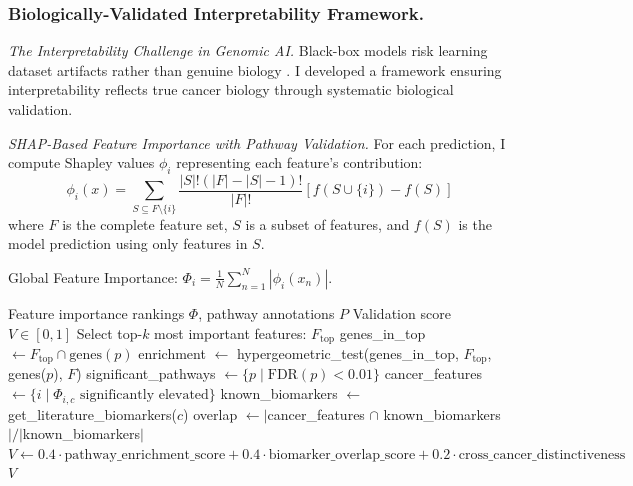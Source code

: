 \documentclass[manuscript, screen, review]{jair}
\begin{document}
\subsubsection{Biologically-Validated Interpretability Framework.}
\label{sec:interpretability}

\emph{The Interpretability Challenge in Genomic AI.} Black-box models risk learning dataset artifacts rather than genuine biology \citep{ghassemi2021false}. I developed a framework ensuring interpretability reflects true cancer biology through systematic biological validation.

\emph{SHAP-Based Feature Importance with Pathway Validation.} For each prediction, I compute Shapley values $\phi_i$ representing each feature's contribution:
\begin{equation}
  \phi_i(x) = \sum_{S \subseteq F \setminus \{i\}} \frac{|S|!(|F|-|S|-1)!}{|F|!} \left[ f(S \cup \{i\}) - f(S) \right]
  \label{eq:shapley}
\end{equation}
where $F$ is the complete feature set, $S$ is a subset of features, and $f(S)$ is the model prediction using only features in $S$.

Global Feature Importance: $\Phi_i = \frac{1}{N} \sum_{n=1}^{N} |\phi_i(x_n)|$.

\begin{algorithm}[!t]
\caption{Biological Validation of Feature Importance}
\label{alg:validation}
\begin{algorithmic}[1]
\Require Feature importance rankings $\Phi$, pathway annotations $P$
\Ensure Validation score $V \in [0,1]$
\State Select top-$k$ most important features: $F_{\text{top}}$
 
  \State genes\_in\_top $\gets F_{\text{top}} \cap \text{genes}(p)$
  \State enrichment $\gets$ hypergeometric\_test(genes\_in\_top, $F_{\text{top}}$, genes($p$), $F$)
\EndFor
\State significant\_pathways $\gets \{p \mid \text{FDR}(p) < 0.01\}$
 
  \State cancer\_features $\gets \{i \mid \Phi_{i,c} \text{ significantly elevated}\}$
  \State known\_biomarkers $\gets$ get\_literature\_biomarkers($c$)
  \State overlap $\gets |$cancer\_features $\cap$ known\_biomarkers$| / |$known\_biomarkers$|$
\EndFor
\State $V \gets 0.4 \cdot \text{pathway\_enrichment\_score} + 0.4 \cdot \text{biomarker\_overlap\_score} + 0.2 \cdot \text{cross\_cancer\_distinctiveness}$
\State \Return $V$
\end{algorithmic}
\end{algorithm}
\end{document}
